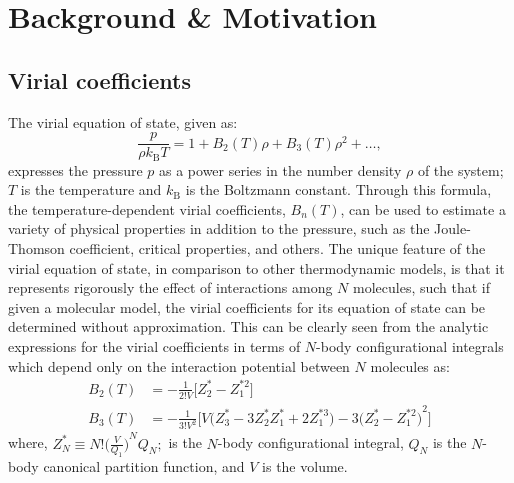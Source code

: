\chapter{Background \& Motivation} \label{chapter1:bgm}
    \section{Virial coefficients}
        The virial equation of state, given as:
        \begin{equation}
          \frac{p}{\rho k_\textrm{B}T} = 1 + B_2(T) \rho + B_3(T) \rho^2 + \ldots,
        \end{equation}
        expresses the pressure $p$ as a power series in the number density $\rho$ of the system; $T$ is the temperature and $k_\textrm{B}$ is the Boltzmann constant. Through this formula, the temperature-dependent virial coefficients, $B_n(T)$, can be used to estimate a variety of physical properties in addition to the pressure, such as the Joule-Thomson coefficient,  critical properties, and others. The unique feature of the virial equation of state, in comparison to other thermodynamic models, is that it represents rigorously the effect of interactions among $N$ molecules, such that if given a molecular model, the virial coefficients for its equation of state can be determined without approximation. This can be clearly seen from the analytic expressions for the virial coefficients in terms of $N$-body configurational integrals \cite{Tester} which depend only on the interaction potential between $N$ molecules as:
        \begin{equation}\label{eq: bn}
            \begin{aligned}
                B_2(T) &= - \frac{1}{2! {V}}  \Big[ Z_2^* - Z_1^{*2} \Big]\\
                B_3(T) &= - \frac{1}{3! {V}^2}  \Big[ {V}  \big( Z_3^* - 3  Z_2^*  Z_1^* + 2  Z_1^{*3} \big) - 3  {\big( Z_2^* - Z_1^{*2} \big)}^2 \Big]
            \end{aligned}
        \end{equation}
        where, $ Z_N^* \equiv N!  {\Big( \displaystyle\frac{{V}}{Q_1} \Big)}^N  Q_N ;$ is the $N$-body configurational integral, $Q_N$ is the $N$-body canonical partition function, and ${V}$ is the volume.

